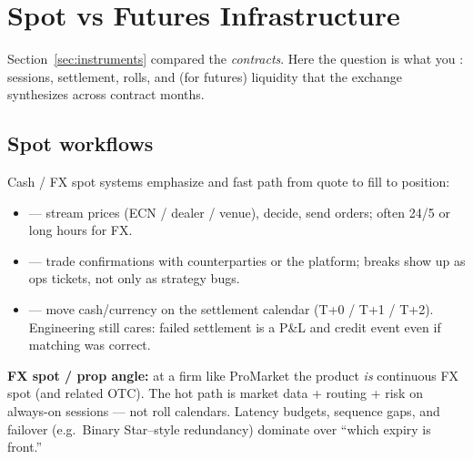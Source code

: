 \section{Spot vs Futures Infrastructure}
\label{sec:spot-futures-infra}
Section~\ref{sec:instruments} compared the \emph{contracts}. Here the question is 
what you : sessions, settlement, rolls, and (for futures) 
 liquidity that the exchange synthesizes across contract months.

\subsection{Spot workflows}
\label{subsec:spot-workflows}
Cash / FX spot systems emphasize  and fast 
path from quote to fill to position:
\begin{itemize}
    \item {} --- stream prices (ECN / dealer / venue), decide, send 
          orders; often 24/5 or long hours for FX.
    \item {} --- trade confirmations with 
          counterparties or the platform; breaks show up as ops tickets, not only as 
          strategy bugs.
    \item {} --- move cash/currency on the settlement calendar 
          (T+0 / T+1 / T+2). Engineering still cares: failed settlement is a P\&L and 
          credit event even if matching was correct.
\end{itemize}
\par\noindent\textbf{FX spot / prop angle:} at a firm like ProMarket the product \emph{is} 
continuous FX spot (and related OTC). The hot path is market data + routing + risk 
on always-on sessions --- not roll calendars. Latency budgets, sequence gaps, and 
failover (e.g.\ Binary Star–style redundancy) dominate over ``which expiry is front.''

